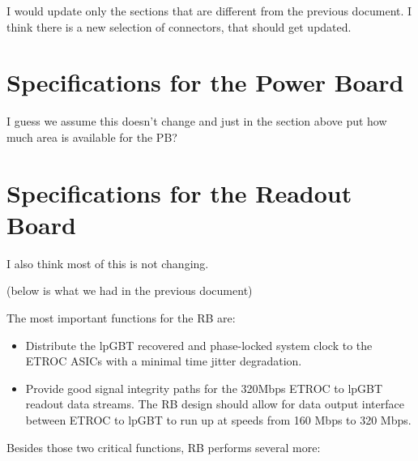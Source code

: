 \documentclass[11pt]{article}
\begin{document}
I would update only the sections that are different from the previous
document. I think there is a new selection of connectors, that should
get updated.

\section{\texorpdfstring{Specifications for the Power Board}{Specifications for the Power Board }}

I guess we assume this doesn't change and just in the section above put how much area is available for the PB?

\section{Specifications for the Readout Board}

I also think most of this is not changing.

(below is what we had in the previous document)

The most important functions for the RB are:

\begin{itemize}
  \item Distribute the lpGBT recovered and phase-locked system clock to the ETROC ASICs with a minimal time jitter degradation.
\item Provide good signal integrity paths for the 320Mbps ETROC to lpGBT readout data streams. The RB design should allow for data output interface between ETROC to lpGBT to run up at speeds from 160 Mbps to
  320 Mbps.
\end{itemize}

Besides those two critical functions, RB performs several more:
\end{document}
